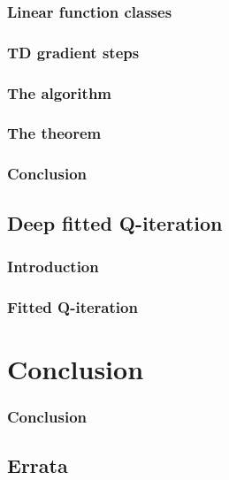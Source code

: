 \documentclass{beamer}[10]
\begin{document}
\begin{frame}
  \frametitle{Linear function classes}

\end{frame}

\begin{frame}
  \frametitle{TD gradient steps}

\end{frame}

\begin{frame}
  \frametitle{The algorithm}

\end{frame}

\begin{frame}
  \frametitle{The theorem}

\end{frame}

\begin{frame}
  \frametitle{Conclusion}

\end{frame}

\subsection{Deep fitted Q-iteration}

\begin{frame}
  \frametitle{Introduction}

\end{frame}

\begin{frame}
  \frametitle{Fitted Q-iteration}

\end{frame}



\section{Conclusion}

\begin{frame}
  \frametitle{Conclusion}
\end{frame}

\subsection{Errata}
\end{document}
